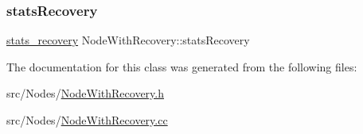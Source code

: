 \mbox{\label{classNodeWithRecovery_abaecd0d1b36ad0305c281905a3465dd6}} 
\subsubsection{\texorpdfstring{stats\+Recovery}{statsRecovery}}
{\footnotesize\ttfamily \hyperlink{NodeWithRecovery_8h_a8724f9aa35500c4029d1757428ade746}{stats\+\_\+recovery} Node\+With\+Recovery\+::stats\+Recovery\hspace{0.3cm}{\ttfamily [protected]}}



The documentation for this class was generated from the following files\+:\begin{DoxyCompactItemize}
\item 
src/\+Nodes/\hyperlink{NodeWithRecovery_8h}{Node\+With\+Recovery.\+h}\item 
src/\+Nodes/\hyperlink{NodeWithRecovery_8cc}{Node\+With\+Recovery.\+cc}\end{DoxyCompactItemize}
